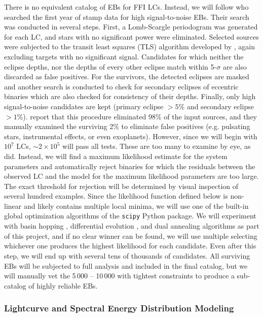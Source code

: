 There is no equivalent catalog of EBs for FFI LCs. Instead, we will follow
\citep{Justesen_Albrecht_21} who searched the first year of \tess{} stamp data
for high signal-to-noise EBs. Their search was conducted in several steps.
First, a Lomb-Scargle periodogram was generated for each LC, and stars with no
significant power were eliminated. Selected sources were subjected to the
transit least squares (TLS) algorithm developed by \citep{Hippke_Heller_19},
again excluding targets with no significant signal. Candidates for which neither
the eclipse depths, nor the depths of every other eclipse match within
5-$\sigma$ are also discarded as false positives. For the survivors, the
detected eclipses are masked and another search is conducted to check for
secondary eclipses of eccentric binaries which are also checked for consistency
of their depths. Finally, only high signal-to-noise candidates are kept (primary
eclipse $>5$\% and secondary eclipse $>1$\%). \citep{Justesen_Albrecht_21}
report that this procedure eliminated 98\% of the input sources, and they
manually examined the surviving 2\% to eliminate false positives (e.g. pulsating
stars, instrumental effects, or even exoplanets). However, since we will begin
with $10^7$ LCs, $\sim2\times10^5$ will pass all tests. These are too many to
examine by eye, as \citep{Justesen_Albrecht_21} did. Instead, we will find a
maximum likelihood estimate for the system parameters and automatically reject
binaries for which the residuals between the observed LC and the model for the
maximum likelihood parameters are too large.  The exact threshold for rejection
will be determined by visual inspection of several hundred examples.  Since the
likelihood function defined below is non-linear and likely contains multiple
local minima, we will use one of the built-in global optimization algorithms of
the \texttt{scipy} Python package. We will experiment with basin hopping
\citep{Wales_Doye_97}, differential evolution \citep{Storn_Price_97}, and dual
annealing \citep{Xiang_et_al_97} algorithms as part of this project, and if no
clear winner can be found, we will use multiple selecting whichever one produces
the highest likelihood for each candidate. Even after this step, we will end up
with several tens of thousands of candidates.  All surviving EBs will be
subjected to full analysis and included in the final catalog, but we will
manually vet the 5\,000 -- 10\,000 with tightest constraints to produce a
sub-catalog of highly reliable EBs.

\subsubsection{Lightcurve and Spectral Energy Distribution Modeling}
%
\label{sec:params_lc_sed_modeling}

